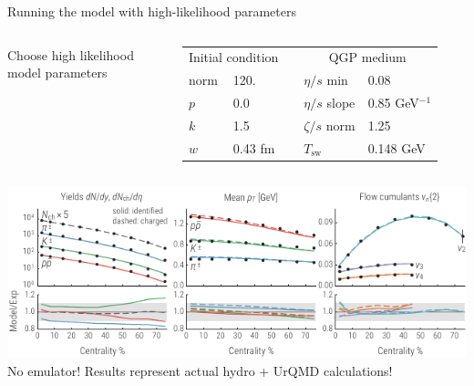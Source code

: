 \documentclass[xcolor=dvipsnames]{beamer}
\begin{document}
\begin{frame}{Running the model with high-likelihood parameters}
    \vfill
    \centering
    \scriptsize
    \begin{columns}
        \begin{column}{0.4\textwidth}
            Choose high likelihood \\model parameters
        \end{column}
        \begin{column}{0.6\textwidth}
            \begin{tabular}{lllll}
                \multicolumn{2}{c}{Initial condition} & & \multicolumn{2}{c}{QGP medium} \\
                \noalign{\smallskip}\hline\noalign{\smallskip}
                norm & 120.          &&  $\eta/s$ min   & 0.08       \\
                $p$  & 0.0           &&  $\eta/s$ slope & 0.85 GeV$^{-1}$   \\
                $k$  & 1.5           &&  $\zeta/s$ norm & 1.25       \\
                $w$  & 0.43 fm       &&  $T_\text{sw}$  & 0.148 GeV  \\
            \end{tabular}
        \end{column}
    \end{columns}
    \vspace{0.5 cm}
    \includegraphics[width=\textwidth]{mode_observables} \\
    \vspace{0.2 cm}
    No emulator! Results represent actual hydro + UrQMD calculations!
\end{frame}
\end{document}
